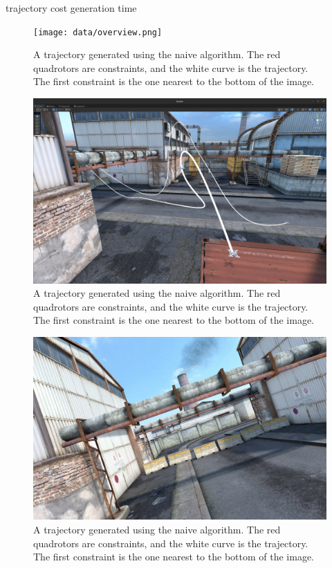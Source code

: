 \documentclass[pageno]{jpaper}
\begin{document}
trajectory cost
generation time

\begin{figure}[hbt]
  \texttt{[image: data/overview.png]}
  \caption{A trajectory generated using the naive algorithm. The red quadrotors are constraints, and the white curve is the trajectory. The first constraint is the one nearest to the bottom of the image.}
  \label{fig:overview}
\end{figure}

\begin{figure}[hbt]
  \includegraphics[width=\linewidth]{data/landing.png}
  \caption{A trajectory generated using the naive algorithm. The red quadrotors are constraints, and the white curve is the trajectory. The first constraint is the one nearest to the bottom of the image.}
  \label{fig:landing}
\end{figure}

\begin{figure}[hbt]
  \includegraphics[width=\linewidth]{data/onboard.png}
  \caption{A trajectory generated using the naive algorithm. The red quadrotors are constraints, and the white curve is the trajectory. The first constraint is the one nearest to the bottom of the image.}
  \label{fig:onboard}
\end{figure}
\end{document}
